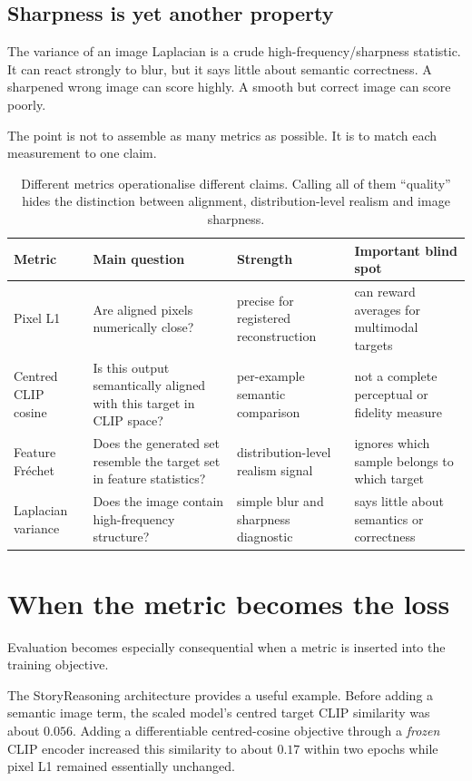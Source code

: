 \subsection{Sharpness is yet another property}

The variance of an image Laplacian is a crude high-frequency/sharpness statistic. It can react strongly to blur, but it says little about semantic correctness. A sharpened wrong image can score highly. A smooth but correct image can score poorly.

The point is not to assemble as many metrics as possible. It is to match each measurement to one claim.

\begin{table}[ht]
\centering
\footnotesize
\begin{tabular}{lp{}p{}p{}}
\toprule
Metric & Main question & Strength & Important blind spot \\
\midrule
Pixel L1 & Are aligned pixels numerically close? & precise for registered reconstruction & can reward averages for multimodal targets \\
Centred CLIP cosine & Is this output semantically aligned with this target in CLIP space? & per-example semantic comparison & not a complete perceptual or fidelity measure \\
Feature Fr\'echet & Does the generated set resemble the target set in feature statistics? & distribution-level realism signal & ignores which sample belongs to which target \\
Laplacian variance & Does the image contain high-frequency structure? & simple blur and sharpness diagnostic & says little about semantics or correctness \\
\bottomrule
\end{tabular}
\caption{Different metrics operationalise different claims. Calling all of them ``quality'' hides the distinction between alignment, distribution-level realism and image sharpness.}
\label{tab:week10-metrics}
\end{table}

\section{When the metric becomes the loss}

Evaluation becomes especially consequential when a metric is inserted into the training objective.

The StoryReasoning architecture provides a useful example. Before adding a semantic image term, the scaled model's centred target CLIP similarity was about \(0.056\). Adding a differentiable centred-cosine objective through a \emph{frozen} CLIP encoder increased this similarity to about \(0.17\) within two epochs while pixel L1 remained essentially unchanged.

